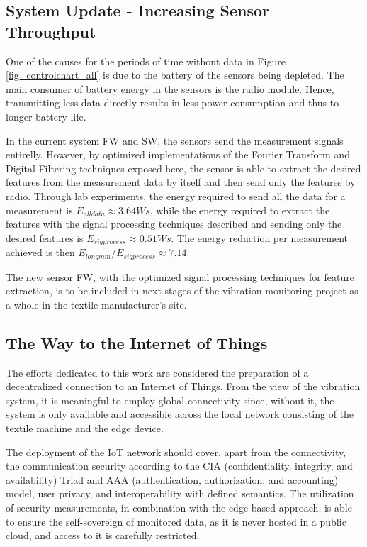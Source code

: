 \documentclass[conference]{IEEEtran}
\begin{document}
\subsection{System Update - Increasing Sensor Throughput}

One of the causes for the periods of time without data in Figure \ref{fig_controlchart_all} is due to the battery of the sensors being depleted. The main consumer of battery energy in the sensors is the radio module. Hence, transmitting less data directly results in less power consumption and thus to longer battery life.

In the current system FW and SW, the sensors send the measurement signals entirelly. However, by optimized implementations of the Fourier Transform and Digital Filtering techniques exposed here, the sensor is able to extract the desired features from the measurement data by itself and then send only the features by radio. Through lab experiments, the energy required to send all the data for a measurement is $E_{alldata}\approx 3.64 Ws$, while the energy required to extract the features with the signal processing techniques described and sending only the desired features is $E_{sigprocess} \approx 0.51 Ws$. The energy reduction per measurement achieved is then $E_{longmm}/E_{sigprocess} \approx 7.14$.

The new sensor FW, with the optimized signal processing techniques for feature extraction, is to be included in next stages of the vibration monitoring project as a whole in the textile manufacturer's site.






\subsection{The Way to the Internet of Things}
The efforts dedicated to this work are considered the preparation of a decentralized connection to an Internet of Things. From the view of the vibration system, it is meaningful to employ global connectivity since, without it, the system is only available and accessible across the local network consisting of the textile machine and the edge device.

The deployment of the 	IoT network should cover, apart from the connectivity, the communication security according to the CIA (confidentiality, integrity, and availability) Triad and AAA (authentication, authorization, and accounting) model, user privacy, and interoperability with defined semantics. The utilization of security measurements, in combination with the edge-based approach, is able to ensure the self-sovereign of monitored data, as it is never hosted in a public cloud, and access to it is carefully restricted.
\end{document}
